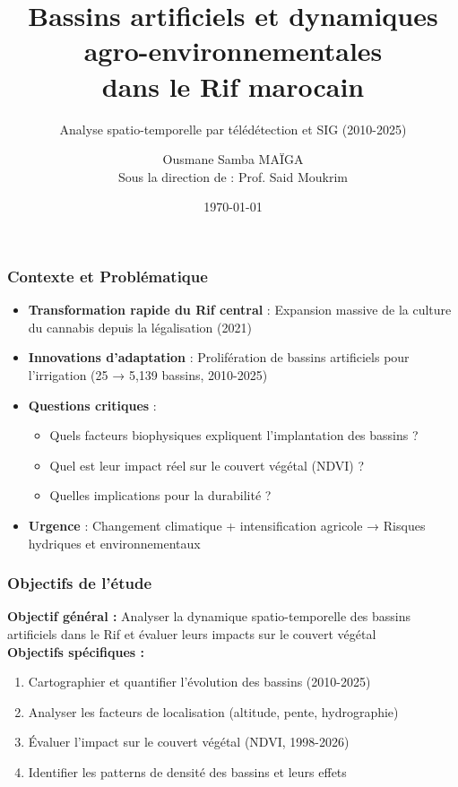 \documentclass{beamer}
\title{Bassins artificiels et dynamiques agro-environnementales \\ dans le Rif marocain}
\subtitle{Analyse spatio-temporelle par télédétection et SIG (2010-2025)}
\author{Ousmane Samba MAÏGA \\ \small{Sous la direction de : Prof. Said Moukrim}}
\institute{Rur\_Dynamix Conference 2026 \\ Rural Development and Environmental Dynamics}
\date{\today}
\begin{document}
\frame{\titlepage}

\begin{frame}
\frametitle{Contexte et Problématique}
\begin{itemize}
  \item \textbf{Transformation rapide du Rif central} : Expansion massive de la culture du cannabis depuis la légalisation (2021)
  \item \textbf{Innovations d'adaptation} : Prolifération de bassins artificiels pour l'irrigation (25 → 5,139 bassins, 2010-2025)
  \item \textbf{Questions critiques} :
  \begin{itemize}
    \item Quels facteurs biophysiques expliquent l'implantation des bassins ?
    \item Quel est leur impact réel sur le couvert végétal (NDVI) ?
    \item Quelles implications pour la durabilité ?
  \end{itemize}
  \item \textbf{Urgence} : Changement climatique + intensification agricole → Risques hydriques et environnementaux
\end{itemize}
\end{frame}

\begin{frame}
\frametitle{Objectifs de l'étude}
\textbf{Objectif général :} Analyser la dynamique spatio-temporelle des bassins artificiels dans le Rif et évaluer leurs impacts sur le couvert végétal
\\[0.5cm]
\textbf{Objectifs spécifiques :}
\begin{enumerate}
  \item Cartographier et quantifier l'évolution des bassins (2010-2025)
  \item Analyser les facteurs de localisation (altitude, pente, hydrographie)
  \item Évaluer l'impact sur le couvert végétal (NDVI, 1998-2026)
  \item Identifier les patterns de densité des bassins et leurs effets
\end{enumerate}
\end{frame}
\end{document}

